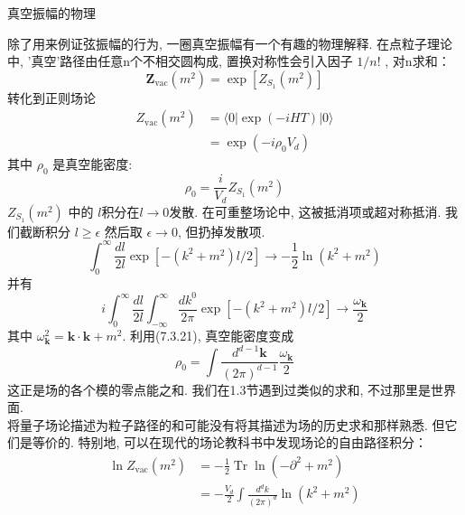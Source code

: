 \centerline{\Large 真空振幅的物理}
除了用来例证弦振幅的行为, 一圈真空振幅有一个有趣的物理解释. 在点粒子理论中, '真空'路径由任意n个不相交圆构成, 置换对称性会引入因子 $1 / n !$ , 对n求和：
\begin{equation}
	\boldsymbol{Z}_{\mathrm{vac}}\left(m^{2}\right)=\exp \left[Z_{S_{1}}\left(m^{2}\right)\right]
\end{equation}
转化到正则场论
\begin{equation}
	\begin{aligned}
		Z_{\mathrm{vac}}\left(m^{2}\right) &=\langle 0|\exp (-i H T)| 0\rangle \\
		&=\exp \left(-i \rho_{0} V_{d}\right)
	\end{aligned}
\end{equation}
其中 $\rho_{0}$ 是真空能密度:
\begin{equation}
	\rho_{0}=\frac{i}{V_{d}} Z_{S_{1}}\left(m^{2}\right)
\end{equation}
 $Z_{S_{1}}\left(m^{2}\right)$ 中的 $l$积分在$l \rightarrow 0 $发散. 在可重整场论中, 这被抵消项或超对称抵消. 我们截断积分 $l \geq \epsilon$ 然后取 $\epsilon \rightarrow 0$, 但扔掉发散项. 
\begin{equation}
	\int_{0}^{\infty} \frac{d l}{2 l} \exp \left[-\left(k^{2}+m^{2}\right) l / 2\right] \rightarrow-\frac{1}{2} \ln \left(k^{2}+m^{2}\right)
\end{equation}
并有
\begin{equation}
	i \int_{0}^{\infty} \frac{d l}{2 l} \int_{-\infty}^{\infty} \frac{d k^{0}}{2 \pi} \exp \left[-\left(k^{2}+m^{2}\right) l / 2\right] \rightarrow \frac{\omega_{\mathbf{k}}}{2}
\end{equation}
其中 $\omega_{\mathbf{k}}^{2}=\mathbf{k} \cdot \mathbf{k}+m^{2}$. 利用(7.3.21), 真空能密度变成
\begin{equation}
	\rho_{0}=\int \frac{d^{d-1} \mathbf{k}}{(2 \pi)^{d-1}} \frac{\omega_{\mathbf{k}}}{2}
\end{equation}
这正是场的各个模的零点能之和. 我们在1.3节遇到过类似的求和, 不过那里是世界面.\\
将量子场论描述为粒子路径的和可能没有将其描述为场的历史求和那样熟悉. 但它们是等价的. 特别地, 可以在现代的场论教科书中发现场论的自由路径积分： 
\begin{equation}
	\begin{aligned}
		\ln Z_{\mathrm{vac}}\left(m^{2}\right) &=-\frac{1}{2} \operatorname{Tr} \ln \left(-\partial^{2}+m^{2}\right) \\
		&=-\frac{V_{d}}{2} \int \frac{d^{d} k}{(2 \pi)^{d}} \ln \left(k^{2}+m^{2}\right)
	\end{aligned}
\end{equation}
